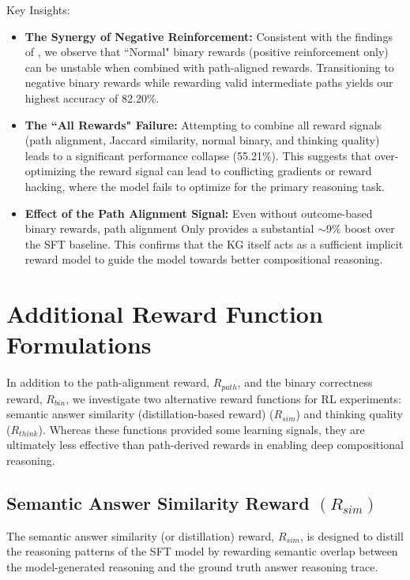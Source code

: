 \documentclass{article}
\theoremstyle{plain}
\theoremstyle{definition}
\theoremstyle{remark}
\begin{document}
Key Insights:
\begin{itemize}
    \item \textbf{The Synergy of Negative Reinforcement:} Consistent with the findings of \cite{Zhu2025}, we observe that ``Normal" binary rewards (positive reinforcement only) can be unstable when combined with path-aligned rewards. Transitioning to negative binary rewards while rewarding valid intermediate paths yields our highest accuracy of 82.20\%.

    \item \textbf{The ``All Rewards" Failure:} Attempting to combine all reward signals (path alignment, Jaccard similarity, normal binary, and thinking quality) leads to a significant performance collapse (55.21\%). This suggests that over-optimizing the reward signal can lead to conflicting gradients or reward hacking, where the model fails to optimize for the primary reasoning task.

    \item \textbf{Effect of the Path Alignment Signal:} Even without outcome-based binary rewards, path alignment Only provides a substantial $\sim$9\% boost over the SFT baseline. This confirms that the KG itself acts as a sufficient implicit reward model to guide the model towards better compositional reasoning.
    
\end{itemize}


\newpage
\section{Additional Reward Function Formulations}
\label{Appendix C}
In addition to the path-alignment reward, $R_{path}$, and the binary correctness reward, $R_{bin}$, we investigate two alternative reward functions for RL experiments: semantic answer similarity (distillation-based reward) ($R_{sim}$) and thinking quality ($R_{think}$). Whereas these functions provided some learning signals, they are ultimately less effective than path-derived rewards in enabling deep compositional reasoning.

\subsection{Semantic Answer Similarity Reward $(R_{sim})$}
The semantic answer similarity (or distillation) reward, $R_{sim}$, is designed to distill the reasoning patterns of the SFT model by rewarding semantic overlap between the model-generated reasoning and the ground truth answer reasoning trace.
\end{document}
